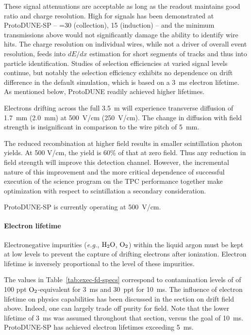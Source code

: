These signal attenuations are acceptable as long as the readout 
maintains good  ratio and charge resolution.  High  for 
 signals has been demonstrated at ProtoDUNE-SP --  =30 
(collection), 15 (induction) -- and the minimum transmissions 
above would not significantly damage the ability to identify 
wire hits.  The charge resolution on individual wires, while not 
a driver of overall event resolution, feeds into $dE/dx$ 
estimation for short segments of tracks and thus into 
particle identification.  Studies of selection efficiencies at 
varied signal levels continue, but notably the \nue 
selection efficiency exhibits no dependence on drift 
difference in the default simulation, which is based on a 
3~ms electron lifetime.  As mentioned below, ProtoDUNE readily 
achieved higher lifetimes.

Electrons drifting across the full 3.5~m will experience 
transverse diffusion of 1.7~mm (2.0~mm) at 500~V/cm (250~V/cm).  
The change in diffusion with field strength is insignificant in comparison to the wire pitch of 5~mm.

The reduced recombination at higher field results in 
smaller scintillation photon yields.  At 500 V/cm, the 
yield is 60\% of that at zero field.  Thus any reduction 
in field strength will improve this detection channel.  
However, the incremental nature of this improvement and 
the more critical dependence of successful execution of 
the science program on the TPC performance together make
optimization with respect to scintillation a secondary consideration.

ProtoDUNE-SP is currently operating at 500~V/cm.

\paragraph{Electron lifetime}
Electronegative impurities ({\em e.g.}, $\rm{H}_{2}\rm{O}$, $\rm{O}_{2}$) within the liquid argon must be kept at 
low levels to prevent the capture of drifting electrons after ionization.  Electron lifetime is inversely proportional to the level of these impurities.

The values in Table~\ref{tab:exec-fd-specs} correspond to 
contamination levels of of 100 ppt $\rm{O}_2$-equivalent 
for 3~ms and 30~ppt for 10~ms.  The influence of electron 
lifetime on physics capabilities has been discussed in the 
section on drift field above.  
Indeed, one can largely trade off purity for field. 
Note that the lower lifetime of 3~ms was assumed throughout 
that section, versus the goal of 10~ms.  ProtoDUNE-SP has achieved electron lifetimes exceeding 5~ms.

